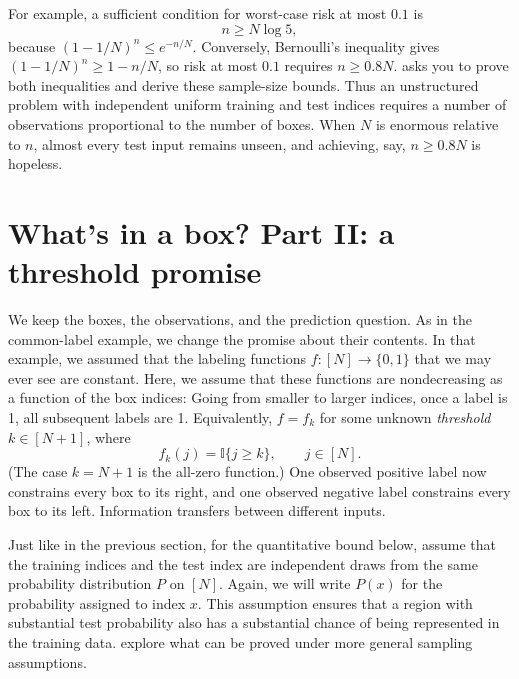 \documentclass[11pt,twoside]{article}
\newcommand{\I}{\mathbb I}
\theoremstyle{definition}
\theoremstyle{remark}
\begin{document}
For example, a sufficient condition for worst-case risk at most $0.1$ is
\begin{equation}
n\ge N\log 5,
\label{eq:sample-upper}
\end{equation}
because $(1-1/N)^n\le e^{-n/N}$. Conversely, Bernoulli's inequality gives
$(1-1/N)^n\ge 1-n/N$, so risk at most $0.1$ requires $n\ge0.8N$.
 asks you to prove both inequalities and derive
these sample-size bounds.
Thus an unstructured problem with independent uniform training and test
indices requires a number of observations proportional to the number of
boxes. When $N$ is enormous relative to $n$, almost every test input remains
unseen, and achieving, say, $n\ge 0.8 N$ is hopeless.

\section{What's in a box? Part II: a threshold promise}
\label{sec:structure}

We keep the boxes, the observations, and the prediction question. As in the
common-label example, we change the promise about their contents.
In that example, we assumed that the labeling functions $f:[N]\to \{0,1\}$ that
we may ever see are constant. Here, we assume that these functions are nondecreasing
as a function of the box indices: Going from smaller to larger indices, once a label is 1,
all subsequent labels are 1. Equivalently,
$f = f_k$ for some
unknown \emph{threshold} $k\in[N+1]$, where
\begin{equation}
f_k(j)=\I\{j\ge k\},
\qquad j\in[N].
\label{eq:threshold}
\end{equation}
(The case $k=N+1$ is the all-zero function.)
One observed positive label now
constrains every box to its right, and one observed negative label constrains
every box to its left. Information transfers between different inputs.

Just like in the previous section,
for the quantitative bound below, assume that the training indices and the
test index are independent draws from the same probability distribution $P$
on $[N]$. Again, we will write $P(x)$ for the probability assigned to index $x$.
This assumption ensures that a region with substantial test probability also has
a substantial chance of being represented in the training data.
explore what can be proved under more general sampling assumptions.
\end{document}
